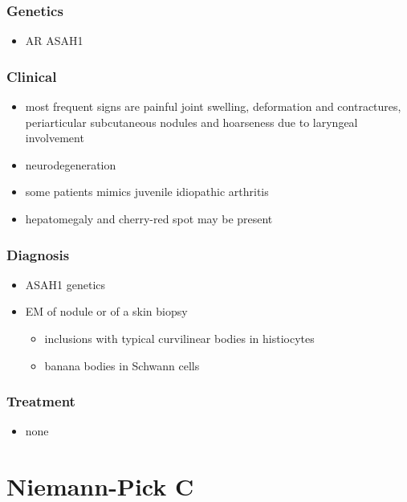\documentclass[12pt]{scrartcl}
\begin{document}
\subsubsection{Genetics}
\label{sec:orge331a0a}
\begin{itemize}
\item AR ASAH1
\end{itemize}
\subsubsection{Clinical}
\label{sec:orgdd5bd4e}
\begin{itemize}
\item most frequent signs are painful joint swelling, deformation and
contractures, periarticular subcutaneous nodules and hoarseness due
to laryngeal involvement
\item neurodegeneration
\item some patients mimics juvenile idiopathic arthritis
\item hepatomegaly and cherry-red spot may be present
\end{itemize}

\subsubsection{Diagnosis}
\label{sec:orgdf63e39}
\begin{itemize}
\item ASAH1 genetics
\item EM of nodule or of a skin biopsy
\begin{itemize}
\item inclusions with typical curvilinear bodies in histiocytes
\item banana bodies in Schwann cells
\end{itemize}
\end{itemize}

\subsubsection{Treatment}
\label{sec:orgb67bd03}
\begin{itemize}
\item none
\end{itemize}
\section{Niemann-Pick C}
\label{sec:org418f11d}
\end{document}
